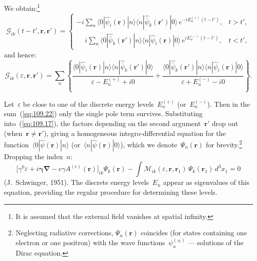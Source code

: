 We obtain:\footnote{It is assumed that the external field vanishes at spatial infinity.}
\begin{equation}
\mathcal{G}_{ik}(t - t', \mathbf{r}, \mathbf{r}') =
\begin{cases}
\displaystyle -i\sum_n \langle 0|\hat{\psi}_i(\mathbf{r})|n\rangle\langle n|\hat{\bar{\psi}}_k(\mathbf{r}')|0\rangle\,e^{-iE_n^{(+)}(t - t')}, & t > t', \\[8pt]
\displaystyle \phantom{-}i\sum_n \langle 0|\hat{\bar{\psi}}_k(\mathbf{r}')|n\rangle\langle n|\hat{\psi}_i(\mathbf{r})|0\rangle\,e^{iE_n^{(-)}(t - t')}, & t < t',
\end{cases}
\label{eq:109.21}
\end{equation}
and hence:
\begin{equation}
\mathcal{G}_{ik}(\varepsilon, \mathbf{r}, \mathbf{r}') = \sum_n\left\{\frac{\langle 0|\hat{\psi}_i(\mathbf{r})|n\rangle\langle n|\hat{\bar{\psi}}_k(\mathbf{r}')|0\rangle}{\varepsilon - E_n^{(+)} + i0} + \frac{\langle 0|\hat{\bar{\psi}}_k(\mathbf{r}')|n\rangle\langle n|\hat{\psi}_i(\mathbf{r})|0\rangle}{\varepsilon + E_n^{(-)} - i0}\right\}.
\label{eq:109.22}
\end{equation}


Let~$\varepsilon$ be close to one of the discrete energy levels~$E_n^{(+)}$ (or~$E_n^{(-)}$). Then in the sum~(\ref{eq:109.22}) only the single pole term survives. Substituting into~(\ref{eq:109.17}), the factors depending on the second argument~$\mathbf{r}'$ drop out (when~$\mathbf{r} \neq \mathbf{r}'$), giving a homogeneous integro-differential equation for the function~$\langle 0|\hat{\psi}(\mathbf{r})|n\rangle$ (or~$\langle n|\hat{\psi}(\mathbf{r})|0\rangle$), which we denote~$\Psi_n(\mathbf{r})$ for brevity.\footnote{Neglecting radiative corrections, $\Psi_n(\mathbf{r})$ coincides (for states containing one electron or one positron) with the wave functions~$\psi_n^{(\pm)}$ --- solutions of the Dirac equation.} Dropping the index~$n$:
\begin{equation}
\bigl[\gamma^0\varepsilon + i\boldsymbol{\gamma}\boldsymbol{\nabla} - e\gamma A^{(e)}(\mathbf{r})\bigr]_{ik}\Psi_k(\mathbf{r}) - \int\!\mathcal{M}_{ik}(\varepsilon, \mathbf{r}, \mathbf{r}_1)\,\Psi_k(\mathbf{r}_1)\,d^3x_1 = 0
\label{eq:109.23}
\end{equation}
(J.~Schwinger, 1951). The discrete energy levels~$E_n$ appear as eigenvalues of this equation, providing the regular procedure for determining these levels.


